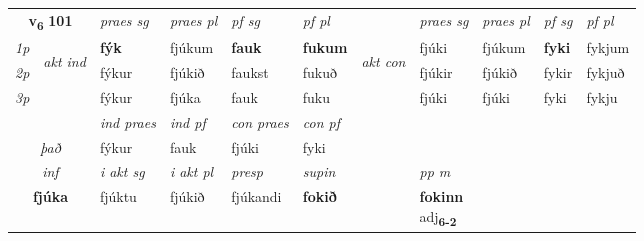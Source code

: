 \noindent
\begin{tabular}{lllllllllll} \toprule
\multicolumn{2}{c}{\textbf{v{\textsubscript{6}}} \Large{\textbf{101}}}  &  \textit{praes sg}  & \textit{praes pl}  &\textit{ pf sg} & \textit{pf pl} &  &  \textit{praes sg}  & \textit{praes pl}  & \textit{pf sg} & \textit{pf pl } \\*
	\cmidrule{3-6} \cmidrule{8-11}
 {\textit{1p}} & \multirow{3}{*}{\begin{turn}{90}\textit{akt ind}\end{turn}} & \textbf{fýk} & fjúkum & \textbf{fauk} & \textbf{fukum} & \multirow{3}{*}{\begin{turn}{90}\textit{akt con}\end{turn}} &fjúki & fjúkum & \textbf{fyki} & fykjum\\*
 {\textit{2p}} &  &  fýkur  & fjúkið & faukst & fukuð & & fjúkir & fjúkið & fykir & fykjuð \\*
{\textit{3p}} &  & fýkur & fjúka & fauk & fuku & & fjúki & fjúki& fyki & fykju \\*
\cmidrule{3-6} \cmidrule{8-11}

   & &  \textit{ind praes} & \textit{ind pf} & \textit{con praes} & \textit{con pf} \\*
\multicolumn{2}{c}{ \textit{það} } & fýkur & fauk & fjúki & fyki \\*

\cmidrule{3-8}
   \multicolumn{2}{c}{\textit{inf}}  & \textit{i akt sg} & \textit{i akt pl}   & \textit{presp} & \textit{supin}  && \textit{pp m} \\*
  \multicolumn{2}{c}{\textbf{fjúka}} & fjúktu  & fjúkið   & fjúkandi &  \textbf{fokið}  && \specialcell{\textbf{fokinn} \\ adj\textbf{\textsubscript{6-2}}} \\*
\end{tabular}

